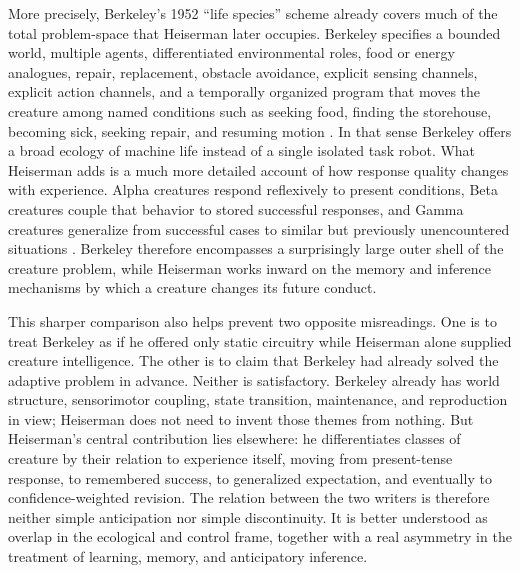 \documentclass[11pt]{article}
\begin{document}
More precisely, Berkeley's 1952 ``life species'' scheme already covers much of the total problem-space that Heiserman later occupies. Berkeley specifies a bounded world, multiple agents, differentiated environmental roles, food or energy analogues, repair, replacement, obstacle avoidance, explicit sensing channels, explicit action channels, and a temporally organized program that moves the creature among named conditions such as seeking food, finding the storehouse, becoming sick, seeking repair, and resuming motion \citep{berkeley1952livingrobots}. In that sense Berkeley offers a broad ecology of machine life instead of a single isolated task robot. What Heiserman adds is a much more detailed account of how response quality changes with experience. Alpha creatures respond reflexively to present conditions, Beta creatures couple that behavior to stored successful responses, and Gamma creatures generalize from successful cases to similar but previously unencountered situations \citep[pp.~17--20]{heiserman1981robot}. Berkeley therefore encompasses a surprisingly large outer shell of the creature problem, while Heiserman works inward on the memory and inference mechanisms by which a creature changes its future conduct.

This sharper comparison also helps prevent two opposite misreadings. One is to treat Berkeley as if he offered only static circuitry while Heiserman alone supplied creature intelligence. The other is to claim that Berkeley had already solved the adaptive problem in advance. Neither is satisfactory. Berkeley already has world structure, sensorimotor coupling, state transition, maintenance, and reproduction in view; Heiserman does not need to invent those themes from nothing. But Heiserman's central contribution lies elsewhere: he differentiates classes of creature by their relation to experience itself, moving from present-tense response, to remembered success, to generalized expectation, and eventually to confidence-weighted revision. The relation between the two writers is therefore neither simple anticipation nor simple discontinuity. It is better understood as overlap in the ecological and control frame, together with a real asymmetry in the treatment of learning, memory, and anticipatory inference.
\end{document}
